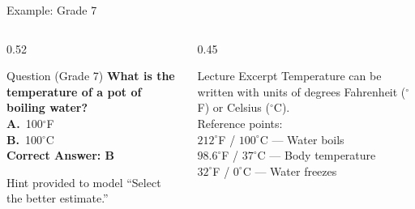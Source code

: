 \documentclass[aspectratio=169]{beamer}
\begin{document}
\begin{frame}{ Example: Grade 7}
\begin{columns}[T]
  \begin{column}{0.52\textwidth}
    \begin{block}{Question (Grade 7)}
      \textbf{What is the temperature of a pot of boiling water?}\\[6pt]
      \textbf{A.}~100$^\circ$F\\
      \textbf{B.}~100$^\circ$C\\[6pt]
      \textcolor{custompurple}{\textbf{Correct Answer: B}}
    \end{block}
    \vspace{0.2cm}
    \begin{alertblock}{Hint provided to model}
      \small ``Select the better estimate.''
    \end{alertblock}
  \end{column}
  \begin{column}{0.45\textwidth}
    \begin{block}{Lecture Excerpt}
      \small
      Temperature can be written with units of degrees Fahrenheit
      ($^\circ$F) or Celsius ($^\circ$C).\\[4pt]
      Reference points:\\
      $212^\circ$F / $100^\circ$C --- Water boils\\
      $98.6^\circ$F / $37^\circ$C --- Body temperature\\
      $32^\circ$F / $0^\circ$C --- Water freezes
    \end{block}
    
    
  \end{column}
\end{columns}
\end{frame}
\end{document}
